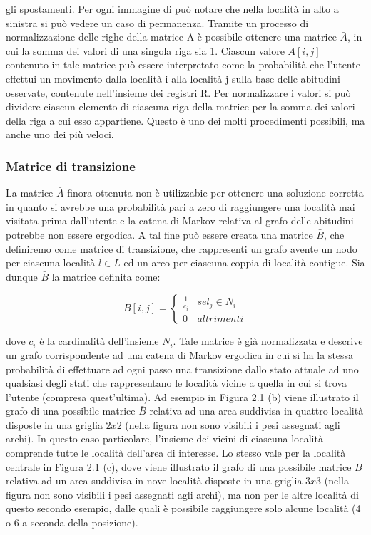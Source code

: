 gli spostamenti. Per ogni immagine di pu\`o notare che nella localit\`a in alto a
sinistra si pu\`o vedere un caso di permanenza.
Tramite un processo di normalizzazione delle righe della matrice A \`e possibile
ottenere una matrice $\bar{A}$, in cui la somma dei valori di una singola riga sia 1.
Ciascun valore $\bar{A}[i, j]$ contenuto in tale matrice pu\`o essere interpretato come
la probabilit\`a che l'utente effettui un movimento dalla localit\`a i alla localit\`a
j sulla base delle abitudini osservate, contenute nell'insieme dei registri R.
Per normalizzare i valori si pu\`o dividere ciascun elemento di ciascuna riga della
matrice per la somma dei valori della riga a cui esso appartiene. Questo \`e uno
dei molti procedimenti possibili, ma anche uno dei pi\`u veloci.

\subsubsection{Matrice di transizione}
La matrice $\bar{A}$ finora ottenuta non \`e utilizzabie per ottenere una soluzione
corretta in quanto si avrebbe una probabilit\`a pari a zero di raggiungere una localit\`a mai visitata
prima dall'utente e la catena di Markov relativa al grafo delle abitudini potrebbe
non essere ergodica. A tal fine pu\`o essere creata una matrice $\bar{B}$,
che definiremo come matrice di transizione, che rappresenti un grafo avente
un nodo per ciascuna localit\`a $l \in L$ ed un arco per ciascuna coppia di localit\`a
contigue. Sia dunque $\bar{B}$ la matrice definita come:

\begin{equation}
\bar{B}[i,j] =
\left\{\begin{matrix}
\frac{1}{c_{i}} & se l_{j} \in N_{i}\\
0 & altrimenti
\end{matrix}\right.
\end{equation}

dove $c_{i}$ \`e la cardinalit\`a dell'insieme $N_{i}$. Tale matrice \`e gi\`a normalizzata e
descrive un grafo corrispondente ad una catena di Markov ergodica in cui si
ha la stessa probabilit\`a di effettuare ad ogni passo una transizione dallo stato
attuale ad uno qualsiasi degli stati che rappresentano le localit\`a vicine a quella
in cui si trova l'utente (compresa quest'ultima).
Ad esempio in Figura 2.1 (b) viene illustrato il grafo di una possibile matrice
$\bar{B}$ relativa ad una area suddivisa in quattro localit\`a disposte in una griglia
$2 x 2$ (nella figura non sono visibili i pesi assegnati agli archi). In questo caso
particolare, l'insieme dei vicini di ciascuna localit\`a comprende tutte le localit\`a
dell'area di interesse. Lo stesso vale per la localit\`a centrale in Figura 2.1 (c),
dove viene illustrato il grafo di una possibile matrice $\bar{B}$ relativa ad un area
suddivisa in nove localit\`a disposte in una griglia $3 x 3$ (nella figura non sono
visibili i pesi assegnati agli archi), ma non per le altre localit\`a di questo secondo
esempio, dalle quali \`e possibile raggiungere solo alcune localit\`a (4 o 6 a seconda
della posizione).

